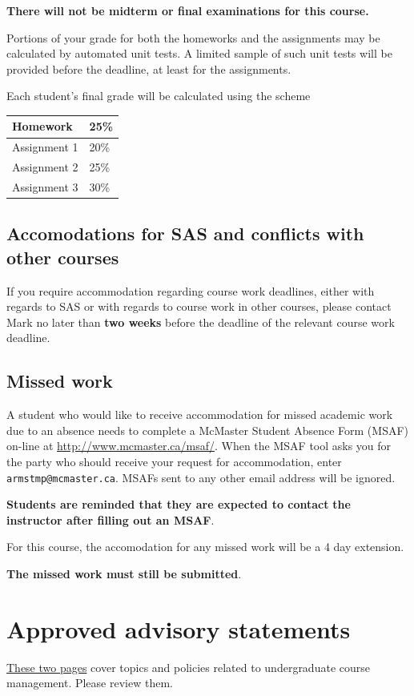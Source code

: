 \documentclass[11pt]{article}
\begin{document}
\textbf{There will not be midterm or final examinations for this course.}

Portions of your grade for both the homeworks and the assignments
may be calculated by automated unit tests.
A limited sample of such unit tests will be provided
before the deadline, at least for the assignments.

Each student's final grade will be calculated using the scheme
\begin{center}
\begin{tabular}{|l|l|}
\hline
Homework & 25\% \\
\hline
Assignment 1 & 20\% \\
\hline
Assignment 2 & 25\% \\
\hline
Assignment 3 & 30\% \\
\hline
\end{tabular}
\end{center}

\subsection{Accomodations for SAS and conflicts with other courses}
\label{sec:org11039e7}
If you require accommodation regarding course work deadlines,
either with regards to SAS or with regards to course work
in other courses, please contact Mark
no later than \textbf{two weeks} before
the deadline of the relevant course work deadline.

\subsection{Missed work}
\label{sec:org67317be}
A student who would like to receive accommodation
for missed academic work due to an absence
needs to complete a McMaster Student Absence Form (MSAF) on-line at
\url{http://www.mcmaster.ca/msaf/}.
When the MSAF tool asks you for the party
who should receive your request for accommodation,
enter \texttt{armstmp@mcmaster.ca}.
MSAFs sent to any other email address will be ignored.

\textbf{Students are reminded that they are expected to contact}
\textbf{the instructor after filling out an MSAF}.

For this course, the accomodation for any missed work will be
a 4 day extension.
\begin{center}
\textbf{The missed work must still be submitted}.
\end{center}

\section{Approved advisory statements}
\label{sec:org61d6d4a}
\href{./media/outline-advisory-statements.pdf}{These two pages} cover topics and policies
related to undergraduate course management.
Please review them.
\end{document}
